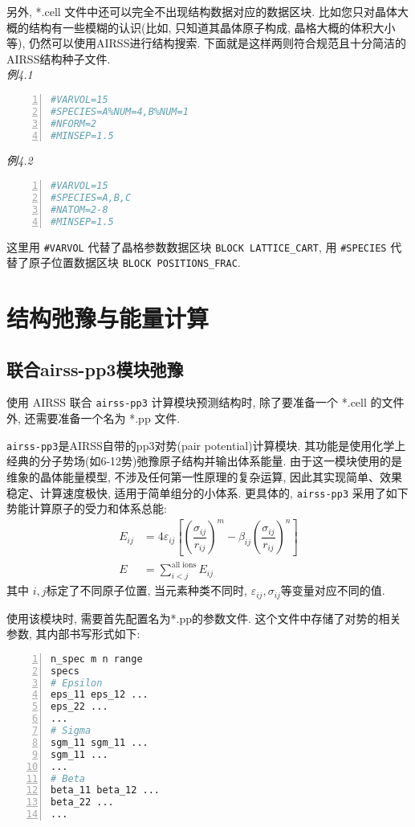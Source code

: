 \documentclass[a4paper, 10pt]{article}
\begin{document}
另外, *.cell 文件中还可以完全不出现结构数据对应的数据区块. 比如您只对晶体大概的结构有一些模糊的认识(比如, 只知道其晶体原子构成, 晶格大概的体积大小等), 仍然可以使用AIRSS进行结构搜索. 下面就是这样两则符合规范且十分简洁的AIRSS结构种子文件.\\
\emph{例4.1}
\begin{lstlisting}[language={bash},numbers=left]
#VARVOL=15
#SPECIES=A%NUM=4,B%NUM=1
#NFORM=2 
#MINSEP=1.5
\end{lstlisting}
\emph{例4.2}
\begin{lstlisting}[language={bash},numbers=left]
#VARVOL=15 
#SPECIES=A,B,C
#NATOM=2-8
#MINSEP=1.5        
\end{lstlisting}

这里用 \verb|#VARVOL| 代替了晶格参数数据区块 \verb|BLOCK LATTICE_CART|, 用 \verb|#SPECIES| 代替了原子位置数据区块 \verb|BLOCK POSITIONS_FRAC|.

\newpage
\section{结构弛豫与能量计算}

\subsection{联合airss-pp3模块弛豫}
使用 AIRSS 联合 \verb|airss-pp3| 计算模块预测结构时, 除了要准备一个 *.cell 的文件外, 还需要准备一个名为 *.pp 文件. 

\verb|airss-pp3|是AIRSS自带的pp3对势(pair potential)计算模块. 其功能是使用化学上经典的分子势场(如6-12势)弛豫原子结构并输出体系能量. 由于这一模块使用的是维象的晶体能量模型, 不涉及任何第一性原理的复杂运算, 因此其实现简单、效果稳定、计算速度极快, 适用于简单组分的小体系. 更具体的, \verb|airss-pp3| 采用了如下势能计算原子的受力和体系总能:
\begin{subequations}
  \label{eq:pp3}
  \begin{align}
    E_{ij} &= 4\varepsilon_{ij}\left[\left(\dfrac{\sigma_{ij}}{r_{ij}}\right)^m -\beta_{ij}\left(\dfrac{\sigma_{ij}}{r_{ij}}\right)^n\right]\\
    E &= \sum_{i<j}^{\text{all ions}} E_{ij}
  \end{align}
\end{subequations}
其中 \(i,j\)标定了不同原子位置, 当元素种类不同时, \(\varepsilon_{ij},\sigma_{ij}\)等变量对应不同的值.

使用该模块时, 需要首先配置名为*.pp的参数文件. 这个文件中存储了对势的相关参数, 其内部书写形式如下: 
\begin{lstlisting}[language={bash},numbers=left]
n_spec m n range
specs
# Epsilon
eps_11 eps_12 ...
eps_22 ...
...
# Sigma
sgm_11 sgm_11 ... 
sgm_11 ... 
...
# Beta
beta_11 beta_12 ...
beta_22 ...
...
\end{lstlisting}
\end{document}
